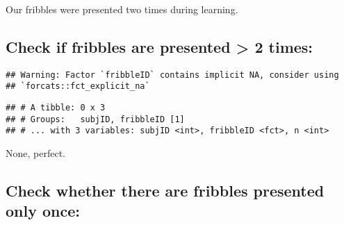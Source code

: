 \documentclass[
]{article}
\newenvironment{Shaded}{\begin{snugshade}}{\end{snugshade}}
\newcommand{\DecValTok}[1]{\textcolor[rgb]{0.00,0.00,0.81}{#1}}
\newcommand{\KeywordTok}[1]{\textcolor[rgb]{0.13,0.29,0.53}{\textbf{#1}}}
\newcommand{\NormalTok}[1]{#1}
\newcommand{\OperatorTok}[1]{\textcolor[rgb]{0.81,0.36,0.00}{\textbf{#1}}}
\newcommand{\StringTok}[1]{\textcolor[rgb]{0.31,0.60,0.02}{#1}}
\begin{document}
Our fribbles were presented two times during learning.

\hypertarget{check-if-fribbles-are-presented-2-times}{%
\subsection{Check if fribbles are presented \textgreater{} 2
times:}\label{check-if-fribbles-are-presented-2-times}}

\begin{Shaded}
\end{Shaded}

\begin{verbatim}
## Warning: Factor `fribbleID` contains implicit NA, consider using
## `forcats::fct_explicit_na`
\end{verbatim}

\begin{verbatim}
## # A tibble: 0 x 3
## # Groups:   subjID, fribbleID [1]
## # ... with 3 variables: subjID <int>, fribbleID <fct>, n <int>
\end{verbatim}

None, perfect.

\hypertarget{check-whether-there-are-fribbles-presented-only-once}{%
\subsection{Check whether there are fribbles presented only
once:}\label{check-whether-there-are-fribbles-presented-only-once}}

\begin{Shaded}
\end{Shaded}
\end{document}
